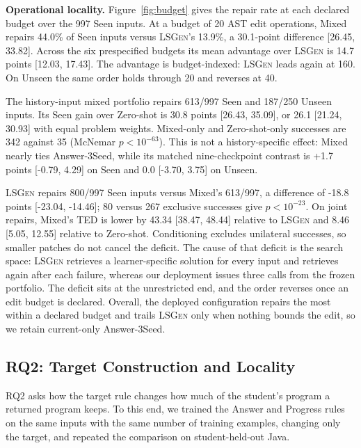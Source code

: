 \documentclass[10pt,conference]{IEEEtran}
\begin{document}
\noindent\textbf{Operational locality.} Figure~\ref{fig:budget} gives the repair rate at each declared budget over the 997 Seen inputs. At a budget of 20 AST edit operations, Mixed repairs 44.0\% of Seen inputs versus \textsc{LSGen}'s 13.9\%, a 30.1-point difference [26.45, 33.82]. Across the six prespecified budgets its mean advantage over \textsc{LSGen} is 14.7 points [12.03, 17.43]. The advantage is budget-indexed: \textsc{LSGen} leads again at 160. On Unseen the same order holds through 20 and reverses at 40.

The history-input mixed portfolio repairs 613/997 Seen and 187/250 Unseen inputs. Its Seen gain over Zero-shot is 30.8 points [26.43, 35.09], or 26.1 [21.24, 30.93] with equal problem weights. Mixed-only and Zero-shot-only successes are 342 against 35 (McNemar \(p<10^{-63}\)). This is not a history-specific effect: Mixed nearly ties Answer-3Seed, while its matched nine-checkpoint contrast is +1.7 points [-0.79, 4.29] on Seen and 0.0 [-3.70, 3.75] on Unseen.

\textsc{LSGen} repairs 800/997 Seen inputs versus Mixed's 613/997, a difference of -18.8 points [-23.04, -14.46]; 80 versus 267 exclusive successes give \(p<10^{-23}\). On joint repairs, Mixed's TED is lower by 43.34 [38.47, 48.44] relative to \textsc{LSGen} and 8.46 [5.05, 12.55] relative to Zero-shot. Conditioning excludes unilateral successes, so smaller patches do not cancel the deficit. The cause of that deficit is the search space: \textsc{LSGen} retrieves a learner-specific solution for every input and retrieves again after each failure, whereas our deployment issues three calls from the frozen portfolio. The deficit sits at the unrestricted end, and the order reverses once an edit budget is declared. Overall, the deployed configuration repairs the most within a declared budget and trails \textsc{LSGen} only when nothing bounds the edit, so we retain current-only Answer-3Seed.

\subsection{RQ2: Target Construction and Locality}
\label{sec:rq-locality}

RQ2 asks how the target rule changes how much of the student's program a returned program keeps. To this end, we trained the Answer and Progress rules on the same inputs with the same number of training examples, changing only the target, and repeated the comparison on student-held-out Java.
\end{document}
